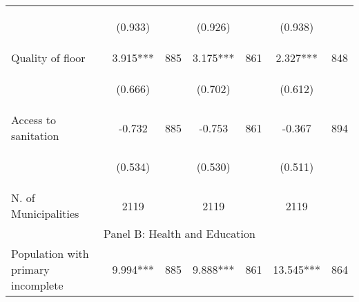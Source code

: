 \begin{tabular}{lcccccc}
\vspace{4pt} &  \begin{footnotesize}(0.933)\end{footnotesize}   & &
			    \begin{footnotesize}(0.926)\end{footnotesize}   & &
			    \begin{footnotesize}(0.938)\end{footnotesize}   &
			     \\          



Quality of floor   &  3.915***   &  885  &   3.175***  &  861 &  2.327***  &  848   \\

\vspace{4pt} &  \begin{footnotesize}(0.666)\end{footnotesize}   & &
			    \begin{footnotesize}(0.702)\end{footnotesize}   & &
			    \begin{footnotesize}(0.612)\end{footnotesize}   &
			     \\          

Access to sanitation   &  -0.732   &  885  &   -0.753  &  861 &  -0.367  &  894   \\

\vspace{4pt} &  \begin{footnotesize}(0.534)\end{footnotesize}   & &
			    \begin{footnotesize}(0.530)\end{footnotesize}   & &
			    \begin{footnotesize}(0.511)\end{footnotesize}   &
			     \\          

N. of Municipalities  &   2119   &  &  2119    & &  2119  &    \\

\hline		
\multicolumn{7}{c}{Panel B: Health and Education}   \\                                                          


Population with primary incomplete   &  9.994***   &  885  &   9.888***  &  861 &  13.545***  &  864   \\



\end{tabular}

